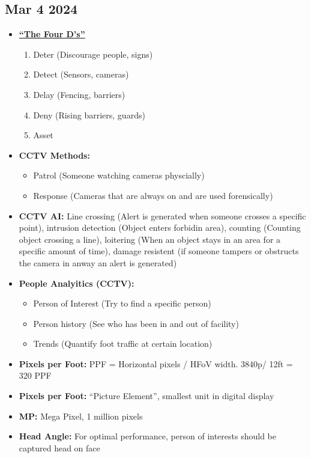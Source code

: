 \documentclass[12pt]{article}
\begin{document}
\subsection*{Mar 4 2024}

\begin{itemize}
		  \item \textbf{\underline{``The Four D's''}}
				\begin{enumerate}
			 			\item Deter (Discourage people, signs)	
			 			\item	Detect (Sensors, cameras)
			 			\item	Delay (Fencing, barriers)
			 			\item	Deny (Rising barriers, guards)
			 			\item	Asset
				\end{enumerate}  
			\item \textbf{CCTV Methods:}
				\begin{itemize}
						\item Patrol (Someone watching cameras physcially)
						\item Response (Cameras that are always on and are used forensically)
				\end{itemize}
			\item \textbf{CCTV AI:} Line crossing (Alert is generated when someone crosses a specific point), 
				intrusion detection (Object enters forbidin area), counting (Counting object crossing a line), 
				loitering (When an object stays in an area for a specific amount of time), damage resistent (if 
				someone tampers or obstructs the camera in anway an alert is generated)
			\item \textbf{People Analyitics (CCTV):}
				\begin{itemize}
						\item Person of Interest (Try to find a specific person)
						\item Person history (See who has been in and out of facility)
						\item Trends (Quantify foot traffic at certain location)
				\end{itemize}
			\item \textbf{Pixels per Foot:} PPF = Horizontal pixels / HFoV width. 3840p/ 12ft = 320 PPF
			\item \textbf{Pixels per Foot:} ``Picture Element'', smallest unit in digital display
			\item \textbf{MP:} Mega Pixel, 1 million pixels
			\item \textbf{Head Angle:} For optimal performance, person of interests should be captured head on face

\end{itemize}
\end{document}
